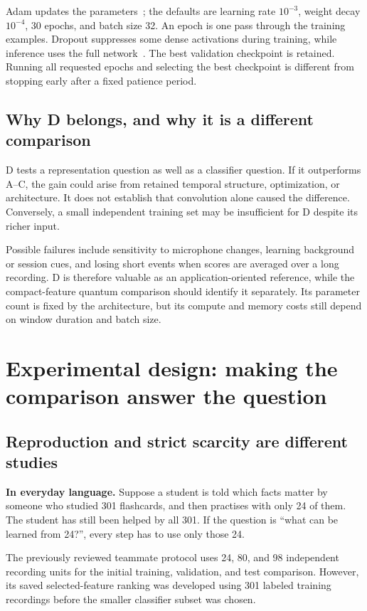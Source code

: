 \documentclass[11pt,letterpaper]{article}
\newcommand{\plain}[1]{\par\smallskip\noindent\textbf{In everyday language.} #1\par\smallskip}
\begin{document}
Adam updates the parameters~\cite{adam}; the defaults are learning rate
$10^{-3}$, weight decay $10^{-4}$, 30 epochs, and batch size 32.
An epoch is one pass through the training examples. Dropout suppresses some
dense activations during training, while inference uses the full
network~\cite{dropout}. The best validation checkpoint is retained. Running
all requested epochs and selecting the best checkpoint is different from
stopping early after a fixed patience period.

\subsection{Why D belongs, and why it is a different comparison}
D tests a representation question as well as a classifier question. If it
outperforms A--C, the gain could arise from retained temporal structure,
optimization, or architecture. It does not establish that convolution alone
caused the difference. Conversely, a small independent training set may be
insufficient for D despite its richer input.

Possible failures include sensitivity to microphone changes, learning
background or session cues, and losing short events when scores are averaged
over a long recording. D is therefore valuable as an application-oriented
reference, while the compact-feature quantum comparison should identify it
separately. Its parameter count is fixed by the architecture, but its compute
and memory costs still depend on window duration and batch size.

\section{Experimental design: making the comparison answer the question}
\label{sec:design}
\subsection{Reproduction and strict scarcity are different studies}
\plain{Suppose a student is told which facts matter by someone who studied
301 flashcards, and then practises with only 24 of them. The student has still
been helped by all 301. If the question is ``what can be learned from 24?'',
every step has to use only those 24.}

The previously reviewed teammate protocol uses 24, 80, and 98 independent
recording units for the initial training, validation, and test comparison.
However, its saved selected-feature ranking was developed using 301 labeled
training recordings before the smaller classifier subset was chosen.
\end{document}
